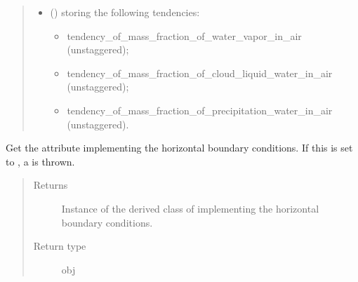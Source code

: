 \documentclass[letterpaper,10pt,english]{sphinxmanual}
\begin{document}
\begin{fulllineitems}
\begin{fulllineitems}
\begin{quote}
\begin{description}
\begin{itemize}
\item {} 
 () \textendash{} 
{\hyperref[\detokenize{api:tasmania.storages.grid_data.GridData}]{}} storing the following tendencies:
\begin{itemize}
\item {} 
tendency\_of\_mass\_fraction\_of\_water\_vapor\_in\_air (unstaggered);

\item {} 
tendency\_of\_mass\_fraction\_of\_cloud\_liquid\_water\_in\_air (unstaggered);

\item {} 
tendency\_of\_mass\_fraction\_of\_precipitation\_water\_in\_air (unstaggered).

\end{itemize}


\end{itemize}

\end{description}\end{quote}

\end{fulllineitems}


\begin{fulllineitems}
\label{\detokenize{api:tasmania.dycore.prognostic_isentropic.PrognosticIsentropic.boundary}}
Get the attribute implementing the horizontal boundary conditions.
If this is set to , a  is thrown.
\begin{quote}\begin{description}
\item[{Returns}] \leavevmode
Instance of the derived class of {\hyperref[\detokenize{api:tasmania.dycore.horizontal_boundary.HorizontalBoundary}]{}} implementing
the horizontal boundary conditions.

\item[{Return type}] \leavevmode
obj

\end{description}\end{quote}

\end{fulllineitems}



\end{fulllineitems}
\end{document}
